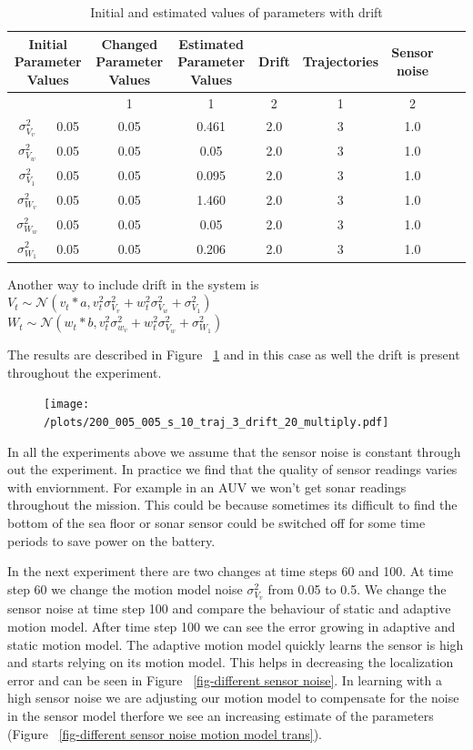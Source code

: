 \documentclass[12pt,draft]{dalcsthesis}
\begin{document}
\begin{table}[tbh]
\centering
\begin{tabular}{|c|c|c|c|c|c|c|c|c|}
\hline 
\multicolumn{2}{|c|}{Initial Parameter Values} & Changed Parameter Values & Estimated Parameter Values & Drift & Trajectories & Sensor noise\tabularnewline
\hline 
 &  & 1 & 1 & 2 & 1 & 2 &  & \tabularnewline
\hline 
$\sigma_{V_{v}}^{2}$ & 0.05 & 0.05 & 0.461 & 2.0 & 3 & 1.0\tabularnewline
\hline 
$\sigma_{V_{w}}^{2}$ & 0.05 & 0.05 & 0.05 &  2.0 & 3 & 1.0\tabularnewline
\hline 
$\sigma_{V_{1}}^{2}$ & 0.05 & 0.05 & 0.095 & 2.0 & 3 & 1.0\tabularnewline
\hline 
$\sigma_{W_{v}}^{2}$ & 0.05 & 0.05 & 1.460 & 2.0 & 3 & 1.0\tabularnewline
\hline 
$\sigma_{W_{w}}^{2}$ & 0.05 & 0.05 & 0.05 & 2.0 & 3 & 1.0\tabularnewline
\hline 
$\sigma_{W_{1}}^{2}$ & 0.05 & 0.05 & 0.206 & 2.0 & 3 & 1.0\tabularnewline
\hline 
\end{tabular}
\caption{\label{tab-:drift}Initial and estimated values of parameters with drift}
\end{table}

Another way to include drift in the system is 
\\
$V_{t}\sim\mathcal{{N}}(v_{t}*a,v_{t}^{2}\sigma_{V_{v}}^{2}+w_{t}^{2}\sigma_{V_{w}}^{2}+\sigma_{V_{1}}^{2})$
\\
$W_{t}\sim\mathcal{{N}}(w_{t}*b,v_{t}^{2}\sigma_{w_{v}}^{2}+w_{t}^{2}\sigma_{V_{w}}^{2}+\sigma_{W_{1}}^{2})$

The results are described in Figure ~\ref{fig-drift_multiply} and in this case as well the drift is present throughout the experiment.
\begin{figure}
  \centering
     {\texttt{[image: /plots/200\_005\_005\_s\_10\_traj\_3\_drift\_20\_multiply.pdf]}}
  \caption{\label{fig-drift_multiply} }
\end{figure}

In all the experiments above we assume that the sensor noise is constant through out the experiment. In practice we find that the quality of sensor readings varies with enviornment. For example in an AUV we won't get sonar readings throughout the mission. This could be because sometimes its difficult to find the bottom of the sea floor or sonar sensor could be switched off for some time periods to save power on the battery.

In the next experiment there are two changes at time steps 60 and 100. At time step 60 we change the motion model noise $\sigma_{V_{v}}^2$ from 0.05 to 0.5. We change the sensor noise  at time step 100 and compare the behaviour of static and adaptive motion model. After time step 100 we can see the error growing in adaptive and static motion model. The adaptive motion model quickly learns the sensor is high and starts relying on its motion model. This helps in decreasing the localization error and can be seen in Figure ~\ref{fig-different sensor noise}. In learning with a high sensor noise we are adjusting our motion model to compensate for the noise in the sensor model therfore we see an increasing estimate of the parameters (Figure ~\ref{fig-different sensor noise motion model trans}).
\end{document}
